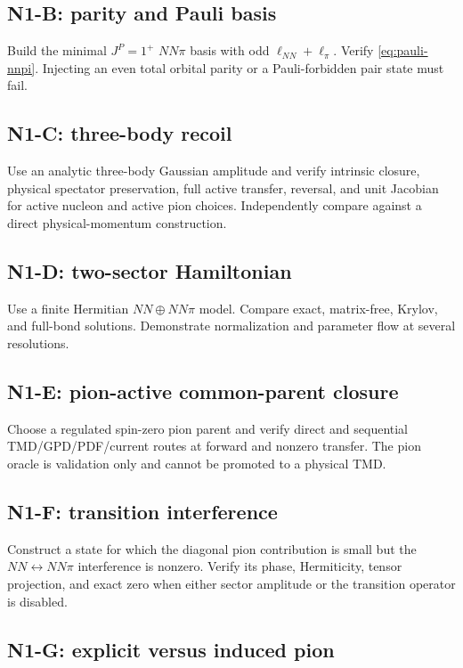 \documentclass[11pt]{article}
\begin{document}
\subsection{N1-B: parity and Pauli basis}

Build the minimal \(J^P=1^+\) \(NN\pi\) basis with odd
\(\ell_{NN}+\ell_\pi\).  Verify \cref{eq:pauli-nnpi}.  Injecting an even total
orbital parity or a Pauli-forbidden pair state must fail.

\subsection{N1-C: three-body recoil}

Use an analytic three-body Gaussian amplitude and verify intrinsic closure,
physical spectator preservation, full active transfer, reversal, and unit
Jacobian for active nucleon and active pion choices.  Independently compare
against a direct physical-momentum construction.

\subsection{N1-D: two-sector Hamiltonian}

Use a finite Hermitian \(NN\oplus NN\pi\) model.  Compare exact, matrix-free,
Krylov, and full-bond solutions.  Demonstrate normalization and parameter flow
at several resolutions.

\subsection{N1-E: pion-active common-parent closure}

Choose a regulated spin-zero pion parent and verify direct and sequential
TMD/GPD/PDF/current routes at forward and nonzero transfer.  The pion oracle
is validation only and cannot be promoted to a physical TMD.

\subsection{N1-F: transition interference}

Construct a state for which the diagonal pion contribution is small but the
\(NN\leftrightarrow NN\pi\) interference is nonzero.  Verify its phase,
Hermiticity, tensor projection, and exact zero when either sector amplitude or
the transition operator is disabled.

\subsection{N1-G: explicit versus induced pion}
\end{document}
